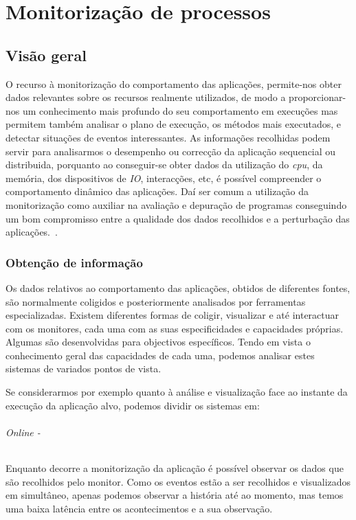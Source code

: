 \chapter{Monitorização de processos}
\label{cap:trabrelacionado}
 
\section{Visão geral} \label{sect:descricao}

O recurso à monitorização do comportamento das aplicações, permite-nos obter dados relevantes sobre os recursos realmente utilizados, de modo a proporcionar-nos um conhecimento mais profundo do seu comportamento em execuções mas permitem também analisar o plano de execução, os métodos mais executados, e detectar situações de eventos interessantes.
As informações recolhidas podem servir para analisarmos o desempenho ou correcção da aplicação sequencial ou distribuida, porquanto ao conseguir-se obter dados da utilização do \textit{cpu}, da memória, dos dispositivos de \textit{IO}, interacções, etc, é possível compreender o comportamento dinâmico das aplicações.
Daí ser comum a utilização da monitorização como auxiliar na avaliação e depuração de programas conseguindo um bom compromisso entre a qualidade dos dados recolhidos e a perturbação das aplicações.~\cite{DuartePhd05}.

\subsection{Obtenção de informação}\label{sect:instrumentation_overview}

Os dados relativos ao comportamento das aplicações, obtidos de diferentes fontes, são normalmente coligidos e posteriormente analisados por ferramentas especializadas.
Existem diferentes formas de coligir, visualizar e até interactuar com os monitores, cada uma com as suas especificidades e capacidades próprias.
Algumas são desenvolvidas para objectivos específicos.
Tendo em vista o conhecimento geral das capacidades de cada uma, podemos analisar estes sistemas de variados pontos de vista.

Se considerarmos por exemplo quanto à análise e visualização face ao instante da execução da aplicação alvo, podemos dividir os sistemas em:
 
\subparagraph*{Online -}
Enquanto decorre a monitorização da aplicação é possível observar os dados que são recolhidos pelo monitor.
Como os eventos estão a ser recolhidos e visualizados em simultâneo, apenas podemos observar a história até ao momento, mas temos uma baixa latência entre os acontecimentos e a sua observação.

